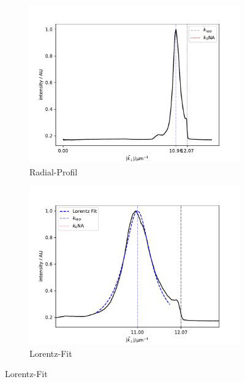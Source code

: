 \documentclass[titlepage]{article}
\begin{document}
	\begin{figure}
		\label{fig:dirt_measure}
		\centering
		\begin{subfigure}[b]{0.5\textwidth}
			\centering
			\includegraphics[width=\textwidth]{figures/dirt_radial.pdf}
			\caption{Radial-Profil}
			\label{fig:dirt_radial}
		\end{subfigure}
		\hfill
		\begin{subfigure}[b]{0.49\textwidth}
			\centering
			\includegraphics[width=\textwidth]{figures/dirt_lorentz.pdf}
			\caption{Lorentz-Fit}
			\label{fig:dirt_lorentz}
		\end{subfigure}
	

\end{figure}
\end{document}
